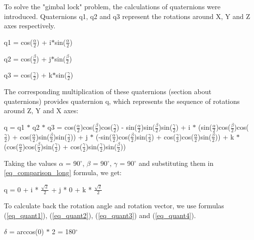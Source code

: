 \documentclass[times, 10pt,twocolumn]{article}
\begin{document}
To solve the "gimbal lock" problem, the calculations of quaternions were introduced. Quaternions q1, q2 and q3 represent the rotations around X, Y and Z axes respectively.

\begin{description}
    \setlength{\itemsep}{0pt}

    \item q1 = cos($\frac{\alpha}{2}$) + i$\ast$sin($\frac{\alpha}{2}$)
    \item q2 = cos($\frac{\beta}{2}$) + j$\ast$sin($\frac{\beta}{2}$)
    \item q3 = cos($\frac{\gamma}{2}$) + k$\ast$sin($\frac{\gamma}{2}$)
\end{description}

The corresponding multiplication of these quaternions (section about quaternions) provides quaternion q, which represents the sequence of rotations around Z, Y and X axes:

\begin{description}
    \setlength{\itemsep}{0pt}

    \item q = q1 $\ast$ q2 $\ast$ q3 = cos($\frac{\alpha}{2}$)cos($\frac{\beta}{2}$)cos($\frac{\gamma}{2}$) - sin($\frac{\alpha}{2}$)sin($\frac{\beta}{2}$)sin($\frac{\gamma}{2}$) + i $\ast$ (sin($\frac{\alpha}{2}$)cos($\frac{\beta}{2}$)cos($\frac{\gamma}{2}$) + cos($\frac{\alpha}{2}$)sin($\frac{\beta}{2}$)sin($\frac{\gamma}{2}$)) + j $\ast$ (-sin($\frac{\alpha}{2}$)cos($\frac{\beta}{2}$)sin($\frac{\gamma}{2}$) + cos($\frac{\gamma}{2}$)cos($\frac{\alpha}{2}$)sin($\frac{\beta}{2}$)) + k $\ast$ (cos($\frac{\alpha}{2}$)cos($\frac{\beta}{2}$)sin($\frac{\gamma}{2}$) + cos($\frac{\gamma}{2}$)sin($\frac{\gamma}{2}$)sin($\frac{\beta}{2}$))
        \begin{equation}
        \label{eq_comparison_long}
        \end{equation}
\end{description}

Taking the values $\alpha$ = 90$^{\circ}$, $\beta$ = 90$^{\circ}$, $\gamma$ = 90$^{\circ}$ and substituting them in \ref{eq_comparison_long} formula, we get:

q = 0 + i * $\frac{\sqrt{2}}{2}$ + j * 0 + k * $\frac{\sqrt{2}}{2}$

To calculate back the rotation angle and rotation vector, we use formulas (\ref{eq_quant1}), (\ref{eq_quant2}), (\ref{eq_quant3}) and (\ref{eq_quant4}).

$\delta$ = arccos(0) $\ast$ 2 = 180$^{\circ}$
\end{document}
